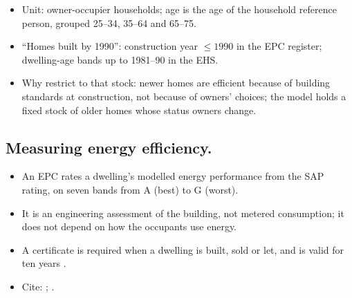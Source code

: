 \begin{itemize}
  \item Unit: owner-occupier households; age is the age of the household
    reference person, grouped 25--34, 35--64 and 65--75.
  \item ``Homes built by 1990'': construction year $\le 1990$ in the EPC
    register; dwelling-age bands up to 1981--90 in the EHS.
  \item Why restrict to that stock: newer homes are efficient because of
    building standards at construction, not because of owners' choices; the
    model holds a fixed stock of older homes whose status owners change.
\end{itemize}

\subsection{Measuring energy efficiency.}\label{sec:data-epc}

\begin{itemize}
  \item An EPC rates a dwelling's modelled energy performance from the SAP
    rating, on seven bands from A (best) to G (worst).
  \item It is an engineering assessment of the building, not metered
    consumption; it does not depend on how the occupants use energy.
  \item A certificate is required when a dwelling is built, sold or let, and
    is valid for ten years \citep{govuk_epc_guide}.
  \item Cite: \citet{govuk_epc_guide}; .
\end{itemize}

